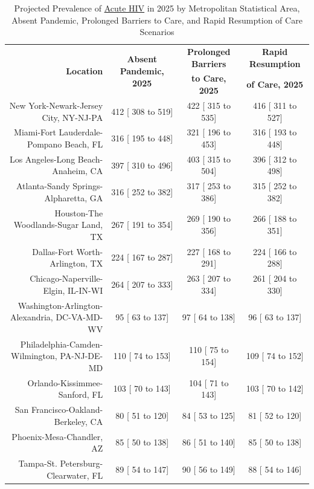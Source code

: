 \documentclass{article}
\begin{document}
\begin{table}[H]
	\caption{Projected Prevalence of \underline{Acute HIV} in 2025 by Metropolitan Statistical Area, Absent Pandemic, Prolonged Barriers to Care, and Rapid Resumption of Care Scenarios}
	\footnotesize
	\begin{tabular}{|r|c|c|c|}
		\hline
		\multirow{2}{*}{\textbf{Location}} & \multirow{2}{*}{\textbf{Absent Pandemic, 2025}} & \textbf{Prolonged Barriers} & \textbf{Rapid Resumption}\\
		&  & \textbf{to Care, 2025} & \textbf{of Care, 2025}\\
		\hline\hline
		New York-Newark-Jersey City, NY-NJ-PA &   412 [  308 to   519] &   422 [  315 to   535] &   416 [  311 to   527]\\
		Miami-Fort Lauderdale-Pompano Beach, FL &   316 [  195 to   448] &   321 [  196 to   453] &   316 [  193 to   448]\\
		Los Angeles-Long Beach-Anaheim, CA &   397 [  310 to   496] &   403 [  315 to   504] &   396 [  312 to   498]\\
		Atlanta-Sandy Springs-Alpharetta, GA &   316 [  252 to   382] &   317 [  253 to   386] &   315 [  252 to   382]\\
		Houston-The Woodlands-Sugar Land, TX &   267 [  191 to   354] &   269 [  190 to   356] &   266 [  188 to   351]\\
		Dallas-Fort Worth-Arlington, TX &   224 [  167 to   287] &   227 [  168 to   291] &   224 [  166 to   288]\\
		Chicago-Naperville-Elgin, IL-IN-WI &   264 [  207 to   333] &   263 [  207 to   334] &   261 [  204 to   330]\\
		Washington-Arlington-Alexandria, DC-VA-MD-WV &    95 [   63 to   137] &    97 [   64 to   138] &    96 [   63 to   137]\\
		Philadelphia-Camden-Wilmington, PA-NJ-DE-MD &   110 [   74 to   153] &   110 [   75 to   154] &   109 [   74 to   152]\\
		Orlando-Kissimmee-Sanford, FL &   103 [   70 to   143] &   104 [   71 to   143] &   103 [   70 to   142]\\
		San Francisco-Oakland-Berkeley, CA &    80 [   51 to   120] &    84 [   53 to   125] &    81 [   52 to   120]\\
		Phoenix-Mesa-Chandler, AZ &    85 [   50 to   138] &    86 [   51 to   140] &    85 [   50 to   138]\\
		Tampa-St. Petersburg-Clearwater, FL &    89 [   54 to   147] &    90 [   56 to   149] &    88 [   54 to   146]\\

\end{tabular}
\end{table}
\end{document}
